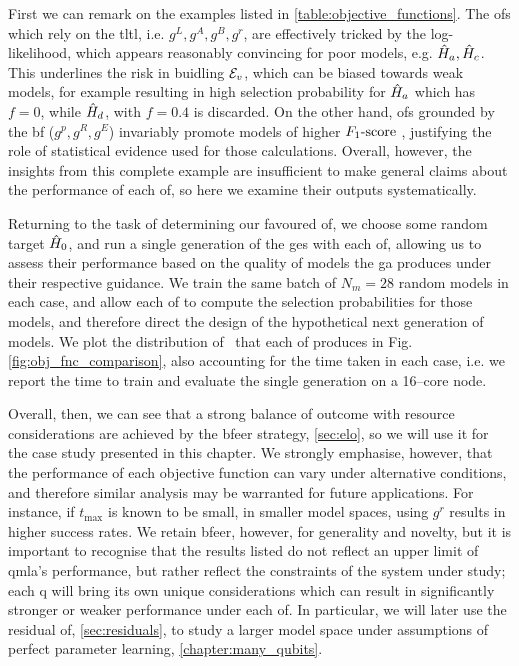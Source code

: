 \par 

First we can remark on the examples listed in \cref{table:objective_functions}. 
The \glspl{of} which rely on the \gls{tltl}, i.e. $g^L, g^A, g^B, g^r$, 
    are effectively tricked by the log-likelihood, which appears reasonably convincing for 
    poor models, e.g. $\hat{H}_a, \hat{H}_c$. 
This underlines the risk in buidling ${ \mathcal{E} }_v$, which can be biased towards weak models, 
    for example resulting in high selection probability for $\hat{H}_a$ which has $f=0$, 
    while $\hat{H}_d$, with $f=0.4$ is discarded. 
On the other hand, \glspl{of} grounded by the \gls{bf} ($g^p, g^R, g^E$) invariably 
    promote models of higher $ F_{1}\text{-score}  \ $, justifying the role of statistical evidence 
    used for those calculations. 
Overall, however, the insights from this complete example are insufficient to 
    make general claims about the performance of each \gls{of}, 
    so here we examine their outputs systematically. 
\par 

Returning to the task of determining our favoured \gls{of}, 
    we choose some random target $\hat{H}_0$, and run a single generation of the \gls{ges} with each \gls{of}, 
    allowing us to assess their performance based on the quality of models the \gls{ga} 
    produces under their respective guidance.
We train the same batch of $N_m=28$ random models in each case, and allow each \gls{of} 
    to compute the selection probabilities for those models, 
    and therefore direct the design of the hypothetical next generation of models. 
We plot the distribution of \fs \ that each \gls{of} produces in Fig. \ref{fig:obj_fnc_comparison},
    also accounting for the time taken in each case, i.e. 
    we report the time to train and evaluate the single generation on a 16--core node.
\par

Overall, then, we can see that a strong balance of outcome with resource considerations 
    are achieved by the \gls{bfeer} strategy, \cref{sec:elo},
    so we will use it for the case study presented in this chapter. 
We strongly emphasise, however, that the performance of each objective function
    can vary under alternative conditions, and therefore similar analysis may 
    be warranted for future applications. 
For instance, if $t_{\textrm{max}}$ is known to be small, 
    in smaller model spaces, using $g^r$ results in higher success rates.
We retain \gls{bfeer}, however, for generality and novelty, 
    but it is important to recognise that the results listed do not reflect
    an upper limit of \gls{qmla}'s performance, 
    but rather reflect the constraints of the system under study; 
    each \gls{q} will bring its own unique considerations which can result in 
    significantly stronger or weaker performance under each \gls{of}. 
In particular, we will later use the residual \gls{of}, \cref{sec:residuals}, 
    to study a larger \gls{model space} under assumptions of perfect parameter learning, \cref{chapter:many_qubits}.



